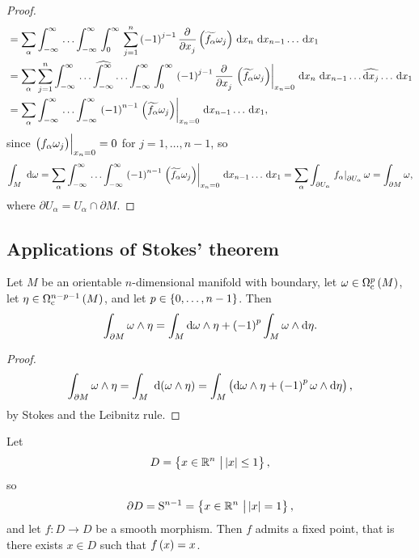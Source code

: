\begin{proof}
\begin{align*}
& = \sum_\alpha \intd{-\infty}{\infty}{\dots \intd{-\infty}{\infty}{\intd{0}{\infty}{\sum_{j = 1}^n \br{-1}^{j - 1}\dpd{}{x_j}\br{\widetilde{f_\alpha}\omega_j}}{x_n}}{x_{n - 1} \dots}}{x_1} \\
& = \sum_\alpha \sum_{j = 1}^n \intd{-\infty}{\infty}{\dots \widehat{\int_{-\infty}^\infty} \dots \intd{-\infty}{\infty}{\intd{0}{\infty}{\br{-1}^{j - 1}\dpd{}{x_j}\eval{\br{\widetilde{f_\alpha}\omega_j}}_{x_n = 0}}{x_n}}{x_{n - 1} \dots \widehat{\d x_j} \dots}}{x_1} \\
& = \sum_\alpha \intd{-\infty}{\infty}{\dots \intd{-\infty}{\infty}{\br{-1}^{n - 1}\eval{\br{\widetilde{f_\alpha}\omega_j}}_{x_n = 0}}{x_{n - 1} \dots}}{x_1},
\end{align*}
since $ \eval{\br{f_\alpha\omega_j}}_{x_n = 0} = 0 $ for $ j = 1, \dots, n - 1 $, so
$$ \intd{M}{}{}{\omega} = \sum_\alpha \intd{-\infty}{\infty}{\dots \intd{-\infty}{\infty}{\br{-1}^{n - 1}\eval{\br{\widetilde{f_\alpha}\omega_j}}_{x_n = 0}}{x_{n - 1} \dots}}{x_1} = \sum_\alpha \int_{\partial U_\alpha} \eval{f_\alpha}_{\partial U_\alpha}\omega = \int_{\partial M} \omega, $$
where $ \partial U_\alpha = U_\alpha \cap \partial M $.
\end{proof}

\pagebreak

\subsection{Applications of Stokes' theorem}


\begin{theorem}
Let $ M $ be an orientable $ n $-dimensional manifold with boundary, let $ \omega \in \Omega_\c^p\br{M} $, let $ \eta \in \Omega_\c^{n - p - 1}\br{M} $, and let $ p \in \cbr{0, \dots, n - 1} $. Then
$$ \int_{\partial M} \omega \wedge \eta = \int_M \d\omega \wedge \eta + \br{-1}^p\int_M \omega \wedge \d\eta. $$
\end{theorem}

\begin{proof}
$$ \int_{\partial M} \omega \wedge \eta = \intd{M}{}{}{\br{\omega \wedge \eta}} = \int_M \br{\d\omega \wedge \eta + \br{-1}^p\omega \wedge \d\eta}, $$
by Stokes and the Leibnitz rule.
\end{proof}

\begin{theorem}
Let
$$ D = \cbr{x \in \RR^n \st \abs{x} \le 1}, $$
so
$$ \partial D = \S^{n - 1} = \cbr{x \in \RR^n \st \abs{x} = 1}, $$
and let $ f : D \to D $ be a smooth morphism. Then $ f $ admits a fixed point, that is there exists $ x \in D $ such that $ f\br{x} = x $.
\end{theorem}


